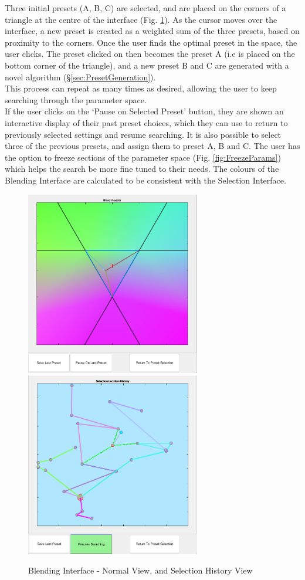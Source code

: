 \documentclass[11pt, oneside]{report}   	%
\begin{document}
Three initial presets (A, B, C) are selected, and are placed on the corners of a triangle at the centre of the interface (Fig. \ref{fig:BlendingInterface}). As the cursor moves over the interface, a new preset is created as a weighted sum of the three presets, based on proximity to the corners. Once the user finds the optimal preset in the space, the user clicks. The preset clicked on then becomes the preset A (i.e is placed on the bottom corner of the triangle), and a new preset B and C are generated with a novel algorithm (\S \ref{sec:PresetGeneration}). \\
This process can repeat as many times as desired, allowing the user to keep searching through the parameter space.\\
If the user clicks on the `Pause on Selected Preset' button, they are shown an interactive display of their past preset choices, which they can use to return to previously selected settings and resume searching. It is also possible to select three of the previous presets, and assign them to preset A, B and C.
The user has the option to freeze sections of the parameter space (Fig. \ref{fig:FreezeParams}) which helps the search be more fine tuned to their needs.
The colours of the Blending Interface are calculated to be consistent with the Selection Interface.
\begin{figure}[h] 
	\centering
	\hspace*{-0.2cm}
	\includegraphics[width = 3.0in]{BlendingInterface1.png}
	\hspace*{0.2cm}
	\includegraphics[width = 3.0in]{BlendingInterface2.png}
	\caption{Blending Interface - Normal View, and Selection History View}
	\label{fig:BlendingInterface}
\end{figure}
\end{document}
